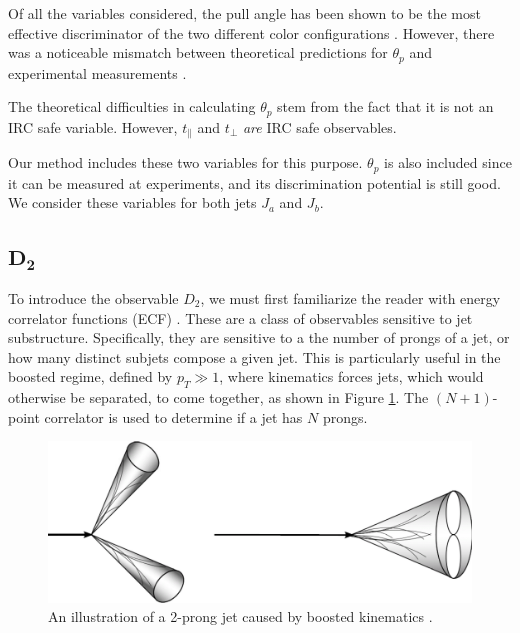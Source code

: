 \documentclass[10pt,a4paper]{book}
\begin{document}
Of all the variables considered, the pull angle has been shown to be the most effective discriminator of the two different color configurations \cite{Gallicchio:2010sw}. However, there was a noticeable mismatch between theoretical predictions for $\theta_p$ and experimental measurements \cite{Larkoski:2019urm}. 

The theoretical difficulties in calculating $\theta_p$ stem from the fact that it is not an IRC safe variable. However, $t_\parallel$ and $t_\perp$ \emph{are} IRC safe observables. 

Our method includes these two variables for this purpose. $\theta_p$ is also included since it can be measured at experiments, and its discrimination potential is still good. We consider these variables for both jets $J_a$ and $J_b$. 

\subsection{$\mathbf{D_2}$}

To introduce the observable $D_2$, we must first familiarize the reader with energy correlator functions (ECF) \cite{Larkoski:2013eya}. These are a class of observables sensitive to jet substructure. Specifically, they are sensitive to a the number of prongs of a jet, or how many distinct subjets compose a given jet. This is particularly useful in the boosted regime, defined by $p_T \gg 1$, where kinematics forces jets, which would otherwise be separated, to come together, as shown in Figure \ref{two pronged boost}. The $(N+1)$-point correlator is used to determine if a jet has $N$ prongs.

\begin{figure}[ht]
\centering
\includegraphics[scale=0.35]{ch4_images/two_prong}
\caption{An illustration of a 2-prong jet caused by boosted kinematics \cite{jet_image}.}
\label{two pronged boost}
\end{figure}
\end{document}
